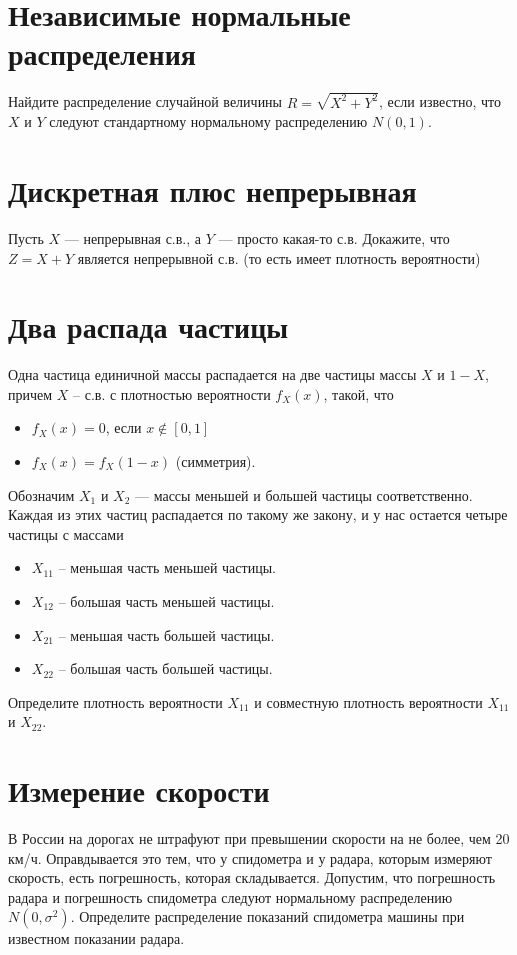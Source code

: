 \documentclass[12pt]{article}
\begin{document}
\section{Независимые нормальные распределения}

Найдите распределение случайной величины $R = \sqrt{X^2 + Y^2}$, если известно, что $X$ и $Y$ следуют стандартному нормальному распределению $N(0, 1)$.

\section{Дискретная плюс непрерывная}

Пусть $X$ --- непрерывная с.в., а $Y$ --- просто какая-то с.в. Докажите, что $Z = X + Y$ является непрерывной с.в. (то есть имеет плотность вероятности)

\section{Два распада частицы}

Одна частица единичной массы распадается на две частицы массы $X$ и $1 - X$, причем $X$ -- с.в. с плотностью вероятности $f_X(x)$, такой, что
\begin{itemize}
    \item $f_X(x) = 0$, если $x \notin [0, 1]$
    \item $f_X(x) = f_X(1 - x)$ (симметрия).
\end{itemize}
Обозначим $X_1$ и $X_2$ --- массы меньшей и большей частицы соответственно. Каждая из этих частиц распадается по такому же закону, и у нас остается четыре частицы с массами
\begin{itemize}
    \item $X_{11}$ -- меньшая часть меньшей частицы.
    \item $X_{12}$ -- большая часть меньшей частицы.
    \item $X_{21}$ -- меньшая часть большей частицы.
    \item $X_{22}$ -- большая часть большей частицы.
\end{itemize}
Определите плотность вероятности $X_{11}$ и совместную плотность вероятности $X_{11}$ и $X_{22}$.

\section{Измерение скорости}

В России на дорогах не штрафуют при превышении скорости на не более, чем 20 км/ч. Оправдывается это тем, что у спидометра и у радара, которым измеряют скорость, есть погрешность, которая складывается. Допустим, что погрешность радара и погрешность спидометра следуют нормальному распределению $N(0, \sigma^2)$. Определите распределение показаний спидометра машины при известном показании радара.
\end{document}
